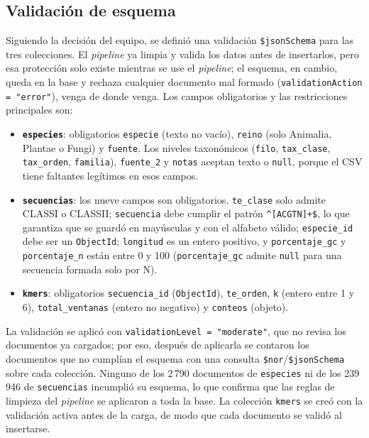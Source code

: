 \subsection*{Validación de esquema}

Siguiendo la decisión del equipo, se definió una validación
\texttt{\$jsonSchema} para las tres colecciones. El \textit{pipeline} ya
limpia y valida los datos antes de insertarlos, pero esa protección
solo existe mientras se use el \textit{pipeline}; el esquema, en cambio,
queda en la base y rechaza cualquier documento mal formado
(\texttt{validationAction = "error"}), venga de donde venga. Los campos
obligatorios y las restricciones principales son:

{\sloppy
\begin{itemize}
  \item \textbf{\texttt{especies}}: obligatorios \texttt{especie} (texto
  no vacío), \texttt{reino} (solo Animalia, Plantae o Fungi) y
  \texttt{fuente}. Los niveles taxonómicos (\texttt{filo},
  \texttt{tax\_clase}, \texttt{tax\_orden}, \texttt{familia}),
  \texttt{fuente\_2} y \texttt{notas} aceptan texto o \texttt{null},
  porque el CSV tiene faltantes legítimos en esos campos.
  \item \textbf{\texttt{secuencias}}: los nueve campos son obligatorios.
  \texttt{te\_clase} solo admite CLASSI o CLASSII; \texttt{secuencia}
  debe cumplir el patrón \texttt{\^{}[ACGTN]+\$}, lo que garantiza que se
  guardó en mayúsculas y con el alfabeto válido; \texttt{especie\_id}
  debe ser un \texttt{ObjectId}; \texttt{longitud} es un entero positivo,
  y \texttt{porcentaje\_gc} y \texttt{porcentaje\_n} están entre 0 y 100
  (\texttt{porcentaje\_gc} admite \texttt{null} para una secuencia
  formada solo por N).
  \item \textbf{\texttt{kmers}}: obligatorios \texttt{secuencia\_id}
  (\texttt{ObjectId}), \texttt{te\_orden}, \texttt{k} (entero entre 1 y
  6), \texttt{total\_ventanas} (entero no negativo) y \texttt{conteos}
  (objeto).
\end{itemize}
\par}

La validación se aplicó con \texttt{validationLevel = "moderate"}, que
no revisa los documentos ya cargados; por eso, después de aplicarla se
contaron los documentos que no cumplían el esquema con una consulta
\texttt{\$nor}/\texttt{\$jsonSchema} sobre cada colección. Ninguno de
los 2\,790 documentos de \texttt{especies} ni de los 239\,946 de
\texttt{secuencias} incumplió su esquema, lo que confirma que las reglas
de limpieza del \textit{pipeline} se aplicaron a toda la base. La
colección \texttt{kmers} se creó con la validación activa antes de la
carga, de modo que cada documento se validó al insertarse.